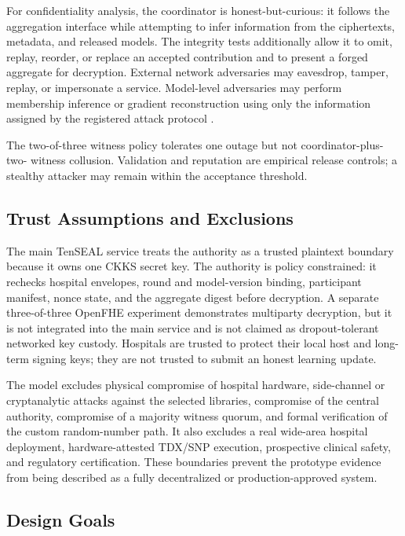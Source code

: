 \documentclass[conference]{IEEEtran}
\begin{document}
For confidentiality analysis, the coordinator is honest-but-curious: it follows
the aggregation interface while attempting to infer information from the
ciphertexts, metadata, and released models. The integrity tests additionally
allow it to omit, replay, reorder, or replace an accepted contribution and to
present a forged aggregate for decryption. External network adversaries may
eavesdrop, tamper, replay, or impersonate a service. Model-level adversaries may
perform membership inference or gradient reconstruction using only the
information assigned by the registered attack protocol
\cite{shokri2017membership,zhu2019dlg,geiping2020inverting}.

The two-of-three witness policy tolerates one outage but not coordinator-plus-two-
witness collusion. Validation and reputation are empirical release controls; a
stealthy attacker may remain within the acceptance threshold.

\subsection{Trust Assumptions and Exclusions}

The main TenSEAL service treats the authority as a trusted plaintext boundary
because it owns one CKKS secret key. The authority is policy constrained: it
rechecks hospital envelopes, round and model-version binding, participant
manifest, nonce state, and the aggregate digest before decryption. A separate
three-of-three OpenFHE experiment demonstrates multiparty decryption, but it is
not integrated into the main service and is not claimed as dropout-tolerant
networked key custody. Hospitals are trusted to protect their local host and
long-term signing keys; they are not trusted to submit an honest learning update.

The model excludes physical compromise of hospital hardware, side-channel or
cryptanalytic attacks against the selected libraries, compromise of the central
authority, compromise of a majority witness quorum, and formal verification of
the custom random-number path. It also excludes a real wide-area hospital
deployment, hardware-attested TDX/SNP execution, prospective clinical safety,
and regulatory certification. These boundaries prevent the prototype evidence
from being described as a fully decentralized or production-approved system.

\subsection{Design Goals}
\end{document}
